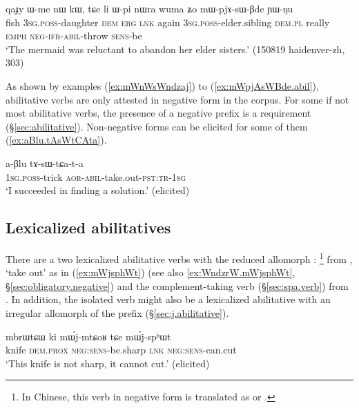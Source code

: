   \begin{exe}
\ex \label{ex:mWpjAsWBde.abil}
 \gll  qaɟy ɯ-me nɯ kɯ, tɕe li ɯ-pi nɯra wuma ʑo mɯ-pjɤ-sɯ-βde ɲɯ-ŋu  \\
 fish \textsc{3sg}.\textsc{poss}-daughter \textsc{dem} \textsc{erg} \textsc{lnk} again \textsc{3sg}.\textsc{poss}-elder.sibling \textsc{dem}.\textsc{pl} really \textsc{emph} \textsc{neg}-\textsc{ifr}-\textsc{abil}-throw \textsc{sens}-be \\
 \glt `The mermaid was reluctant to abandon her elder sisters.' (150819 haidenver-zh, 303)
    \end{exe}  
 
 As shown by examples (\ref{ex:mWnWsWndzaj}) to (\ref{ex:mWpjAsWBde.abil}), abilitative verbs are only attested in negative form in the corpus. For some if not most abilitative verbs, the presence of a negative prefix is a requirement (§\ref{sec:abilitative}). Non-negative forms can be elicited for some of them (\ref{ex:aBlu.tAsWtCAta}).

\begin{exe}
\ex \label{ex:aBlu.tAsWtCAta}
 \gll  a-βlu tɤ-sɯ-tɕa-t-a \\
  \textsc{1sg}.\textsc{poss}-trick \textsc{aor}-\textsc{abil}-take.out-\textsc{pst}:\textsc{tr}-\textsc{1sg} \\
\glt `I succeeded in finding a solution.' (elicited)
\end{exe} 
 
\subsection{Lexicalized abilitatives} \label{sec:abilitative.lexicalized}
There are a two lexicalized abilitative verbs with the reduced allomorph : \footnote{In Chinese, this verb in negative form is translated as  or  . } from , `take out' as in (\ref{ex:mWjsphWt}) (see also \ref{ex:WndzrW.mWjsphWt}, §\ref{sec:obligatory.negative}) and the complement-taking verb  (§\ref{sec:spa.verb}) from  . In addition, the isolated verb  might also be a lexicalized abilitative with an irregular allomorph of the prefix (§\ref{sec:j.abilitative}).

 \begin{exe}
\ex \label{ex:mWjsphWt}
 \gll mbrɯtɕɯ ki mɯ́j-mtɕoʁ tɕe mɯ́j-spʰɯt \\
 knife \textsc{dem}.\textsc{prox} \textsc{neg}:\textsc{sens}-be.sharp \textsc{lnk} \textsc{neg}:\textsc{sens}-can.cut \\
 \glt `This knife is not sharp, it cannot cut.' (elicited)
   \end{exe}

